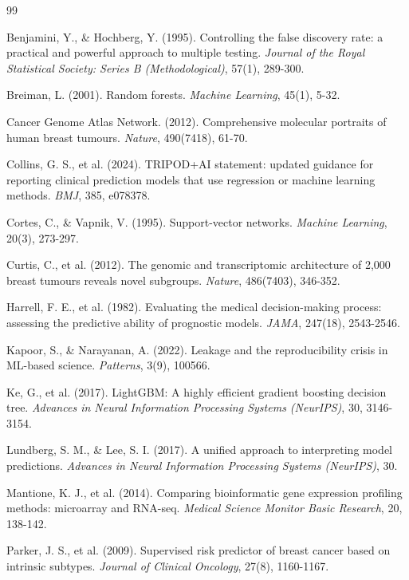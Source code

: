 \documentclass[10pt,a4paper,twocolumn]{article}
\begin{document}
\begin{thebibliography}{99}

 Benjamini, Y., \& Hochberg, Y. (1995). Controlling the false discovery rate: a practical and powerful approach to multiple testing. \textit{Journal of the Royal Statistical Society: Series B (Methodological)}, 57(1), 289-300.

 Breiman, L. (2001). Random forests. \textit{Machine Learning}, 45(1), 5-32.

 Cancer Genome Atlas Network. (2012). Comprehensive molecular portraits of human breast tumours. \textit{Nature}, 490(7418), 61-70.

 Collins, G. S., et al. (2024). TRIPOD+AI statement: updated guidance for reporting clinical prediction models that use regression or machine learning methods. \textit{BMJ}, 385, e078378.

 Cortes, C., \& Vapnik, V. (1995). Support-vector networks. \textit{Machine Learning}, 20(3), 273-297.

 Curtis, C., et al. (2012). The genomic and transcriptomic architecture of 2,000 breast tumours reveals novel subgroups. \textit{Nature}, 486(7403), 346-352.

 Harrell, F. E., et al. (1982). Evaluating the medical decision-making process: assessing the predictive ability of prognostic models. \textit{JAMA}, 247(18), 2543-2546.

 Kapoor, S., \& Narayanan, A. (2022). Leakage and the reproducibility crisis in ML-based science. \textit{Patterns}, 3(9), 100566.

 Ke, G., et al. (2017). LightGBM: A highly efficient gradient boosting decision tree. \textit{Advances in Neural Information Processing Systems (NeurIPS)}, 30, 3146-3154.

 Lundberg, S. M., \& Lee, S. I. (2017). A unified approach to interpreting model predictions. \textit{Advances in Neural Information Processing Systems (NeurIPS)}, 30.

 Mantione, K. J., et al. (2014). Comparing bioinformatic gene expression profiling methods: microarray and RNA-seq. \textit{Medical Science Monitor Basic Research}, 20, 138-142.

 Parker, J. S., et al. (2009). Supervised risk predictor of breast cancer based on intrinsic subtypes. \textit{Journal of Clinical Oncology}, 27(8), 1160-1167.


\end{thebibliography}
\end{document}
